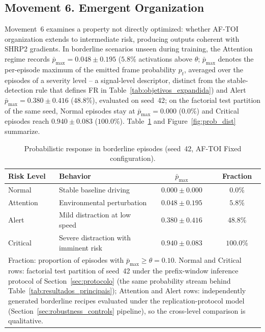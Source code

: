 \documentclass[a4paper,fleqn]{cas-dc}
\newcommand{\AFTOI}{\mbox{AF-TOI}\xspace}
\begin{document}
\subsection{Movement 6. Emergent Organization}
\label{sec:mov6_emergente}
Movement~6 examines a property not directly optimized: whether \AFTOI
organization extends to intermediate risk, producing outputs coherent with SHRP2
gradients. In borderline scenarios unseen during training, the Attention regime
records $\bar{p}_{\max} = 0.048 \pm 0.195$ ($5.8$\% activations above $\theta$;
{\color{\revcolor}$\bar{p}_{\max}$ denotes the per-episode maximum of the
emitted frame probability $p_t$, averaged over the episodes of a severity
level -- a signal-level descriptor, distinct from the stable-detection
rule that defines FR in Table~\ref{tab:objetivos_expandida}})
and Alert $\bar{p}_{\max} = 0.380 \pm 0.416$ ($48.8$\%), evaluated on seed~42{\color{\revcolor}; on the factorial test partition of the same seed, Normal episodes stay at $\bar{p}_{\max} = 0.000$ ($0.0$\%) and Critical episodes reach $0.940 \pm 0.083$ ($100.0$\%)}.
Table~\ref{tab:borderline} and Figure~\ref{fig:prob_dist} summarize.
\begin{table}[!tbp]
\centering
\caption{Probabilistic response in borderline episodes
(seed~42, \mbox{AF-TOI} Fixed configuration).}
\label{tab:borderline}
\footnotesize
\renewcommand{\arraystretch}{1.22}
\setlength{\tabcolsep}{3pt}
\begin{tabularx}{\columnwidth}{l X c c}
\toprule
\textbf{Risk Level} & \textbf{Behavior}
  & \textbf{$\bar{p}_{\max}$} & \textbf{Fraction} \\
\midrule
Normal    & Stable baseline driving
  & {\color{\revcolor}$0.000 \pm 0.000$} & $0.0$\% \\
\rowcolor{gray!8}
Attention & Environmental perturbation
  & $0.048 \pm 0.195$ & $5.8$\% \\
Alert     & Mild distraction at low speed
  & $0.380 \pm 0.416$ & $48.8$\% \\
\rowcolor{gray!8}
Critical  & Severe distraction with imminent risk
  & {\color{\revcolor}$0.940 \pm 0.083$} & {\color{\revcolor}$100.0$\%} \\
\bottomrule
\multicolumn{4}{p{0.96\columnwidth}}{\scriptsize
Fraction: proportion of episodes with $\bar{p}_{\max} \ge \theta = 0.10$.
{\color{\revcolor}Normal and Critical rows: factorial test partition of
seed~42 under the prefix-window inference protocol of
Section~\ref{sec:protocolo} (the same probability stream behind
Table~\ref{tab:resultados_principais}); Attention and Alert rows:
independently generated borderline recipes evaluated under the
replication-protocol model (Section~\ref{sec:robustness_controls}
pipeline), so the cross-level comparison is qualitative.}}
\end{tabularx}
\end{table}
\end{document}
